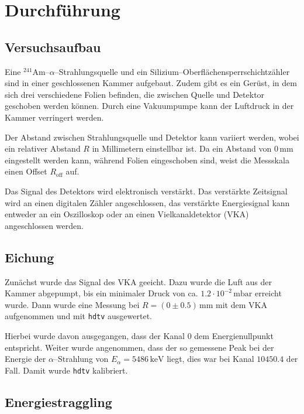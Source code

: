 \documentclass[12pt,a4paper]{scrartcl}
\numberwithin{equation}{section} %
\begin{document}
\hypertarget{durchfuxfchrung}{%
\section{Durchführung}\label{durchfuxfchrung}}

\hypertarget{versuchsaufbau}{%
\subsection{Versuchsaufbau}\label{versuchsaufbau}}

Eine $^{241}\mathrm{Am}$--$\alpha$--Strahlungsquelle und ein Silizium--Oberflächensperrschichtzähler sind in einer geschlossenen Kammer aufgebaut. Zudem gibt es ein Gerüst, in dem sich drei verschiedene Folien befinden, die zwischen Quelle und Detektor geschoben werden können. Durch eine Vakuumpumpe kann der Luftdruck in der Kammer verringert werden.

Der Abstand zwischen Strahlungsquelle und Detektor kann variiert werden, wobei ein relativer Abstand $R$ in Millimetern einstellbar ist. Da ein Abstand von $0\mathrm{\,mm}$ eingestellt werden kann, während Folien eingeschoben sind, weist die Messskala einen Offset $R_\mathrm{off}$ auf.

Das Signal des Detektors wird elektronisch verstärkt. Das verstärkte Zeitsignal wird an einen digitalen Zähler angeschlossen, das verstärkte Energiesignal kann entweder an ein Oszilloskop oder an einen Vielkanaldetektor (VKA) angeschlossen werden.

\hypertarget{eichung}{%
\subsection{Eichung}\label{eichung}}

Zunächst wurde das Signal des VKA geeicht. Dazu wurde die Luft aus der Kammer abgepumpt, bis ein minimaler Druck von ca. $1.2\cdot10^{-2}\mathrm{\,mbar}$ erreicht wurde. Dann wurde eine Messung bei $R=(0\pm0.5)\mathrm{\,mm}$ mit dem VKA aufgenommen und mit \texttt{hdtv} \cite{hdtv} ausgewertet.

Hierbei wurde davon ausgegangen, dass der Kanal $0$ dem Energienullpunkt entspricht. Weiter wurde angenommen, dass der so gemessene Peak bei der Energie der $\alpha$--Strahlung von $E_\alpha = 5486\mathrm{\,keV}$ liegt, dies war bei Kanal $10450.4$ der Fall. Damit wurde \texttt{hdtv} kalibriert.

\hypertarget{energiestraggling}{%
\subsection{Energiestraggling}\label{energiestraggling}}
\end{document}
